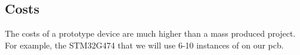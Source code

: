 \subsection{Costs}
	The costs of a prototype device are much higher than a mass produced project. For example, the STM32G474 that we will use 6-10 instances of on our pcb.